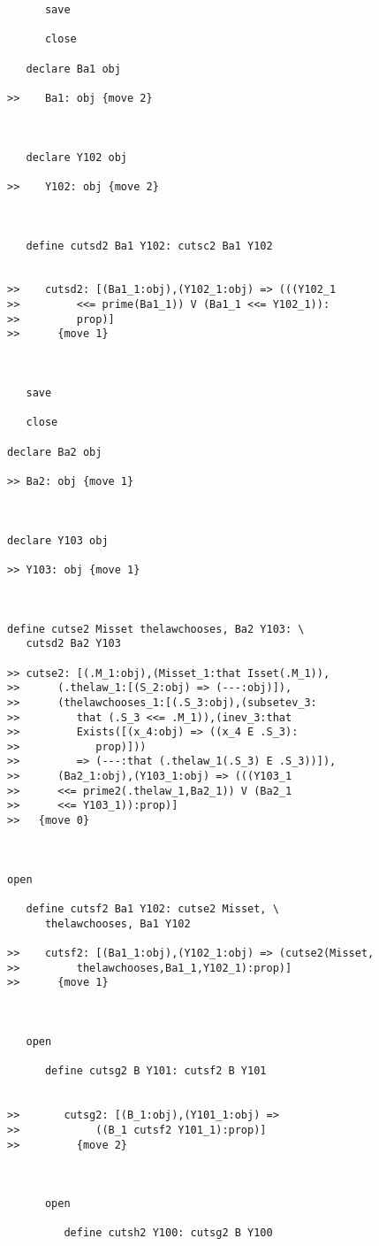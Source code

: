 \documentclass[12pt]{article}
\begin{document}
\begin{verbatim}
      save

      close

   declare Ba1 obj

>>    Ba1: obj {move 2}



   declare Y102 obj

>>    Y102: obj {move 2}



   define cutsd2 Ba1 Y102: cutsc2 Ba1 Y102


>>    cutsd2: [(Ba1_1:obj),(Y102_1:obj) => (((Y102_1
>>         <<= prime(Ba1_1)) V (Ba1_1 <<= Y102_1)):
>>         prop)]
>>      {move 1}



   save

   close

declare Ba2 obj

>> Ba2: obj {move 1}



declare Y103 obj

>> Y103: obj {move 1}



define cutse2 Misset thelawchooses, Ba2 Y103: \
   cutsd2 Ba2 Y103

>> cutse2: [(.M_1:obj),(Misset_1:that Isset(.M_1)),
>>      (.thelaw_1:[(S_2:obj) => (---:obj)]),
>>      (thelawchooses_1:[(.S_3:obj),(subsetev_3:
>>         that (.S_3 <<= .M_1)),(inev_3:that
>>         Exists([(x_4:obj) => ((x_4 E .S_3):
>>            prop)]))
>>         => (---:that (.thelaw_1(.S_3) E .S_3))]),
>>      (Ba2_1:obj),(Y103_1:obj) => (((Y103_1
>>      <<= prime2(.thelaw_1,Ba2_1)) V (Ba2_1
>>      <<= Y103_1)):prop)]
>>   {move 0}



open

   define cutsf2 Ba1 Y102: cutse2 Misset, \
      thelawchooses, Ba1 Y102

>>    cutsf2: [(Ba1_1:obj),(Y102_1:obj) => (cutse2(Misset,
>>         thelawchooses,Ba1_1,Y102_1):prop)]
>>      {move 1}



   open

      define cutsg2 B Y101: cutsf2 B Y101


>>       cutsg2: [(B_1:obj),(Y101_1:obj) =>
>>            ((B_1 cutsf2 Y101_1):prop)]
>>         {move 2}



      open

         define cutsh2 Y100: cutsg2 B Y100



\end{verbatim}
\end{document}
